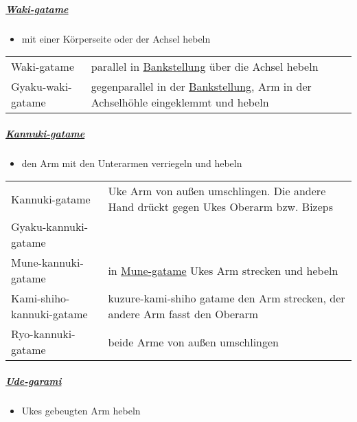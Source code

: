 \documentclass[justified, a4paper, notitlepage, captions=tableheading, nobib]{tufte-handout}
\begin{document}
\subparagraph{\hyperref[org2f5daa2]{Waki-gatame}}
\label{sec:orgbdae0d6}

\begin{itemize}
\item mit einer Körperseite oder der Achsel hebeln
\end{itemize}

\begin{center}
\begin{tabular}{ll}
\label{org2f5daa2}Waki-gatame & parallel in \hyperref[org9811981]{Bankstellung} über die Achsel hebeln\\
\label{orgb21bdb7}Gyaku-waki-gatame & gegenparallel in der \hyperref[org9811981]{Bankstellung}, Arm in der Achselhöhle eingeklemmt und hebeln\\
\end{tabular}
\end{center}

\subparagraph{\hyperref[org32394dc]{Kannuki-gatame}}
\label{sec:org59229b2}

\begin{itemize}
\item den Arm mit den Unterarmen verriegeln und hebeln
\end{itemize}

\begin{center}
\begin{tabular}{ll}
\label{org32394dc}Kannuki-gatame & Uke Arm von außen umschlingen. Die andere Hand drückt gegen Ukes Oberarm bzw. Bizeps\\
\label{orge4d03c9}Gyaku-kannuki-gatame & \\
\label{org6f9bbb8}Mune-kannuki-gatame & in \hyperref[org53d9ef5]{Mune-gatame} Ukes Arm strecken und hebeln\\
\label{orge6ee9dc}Kami-shiho-kannuki-gatame & kuzure-kami-shiho gatame den Arm strecken, der andere Arm fasst den Oberarm\\
\label{orgd652f26}Ryo-kannuki-gatame & beide Arme von außen umschlingen\\
\end{tabular}
\end{center}

\subparagraph{\hyperref[org934b11a]{Ude-garami}}
\label{sec:orga8c0341}

\begin{itemize}
\item Ukes gebeugten Arm hebeln
\end{itemize}
\end{document}
